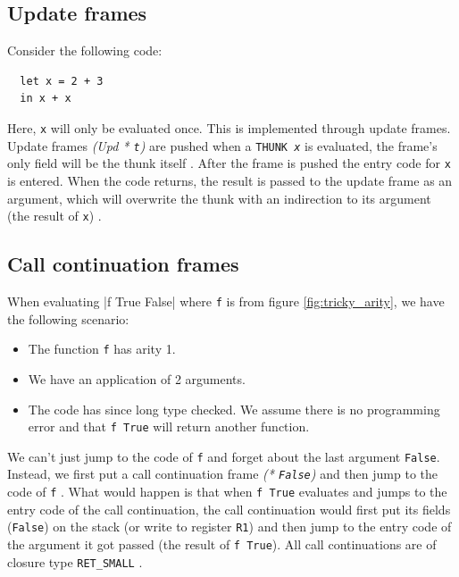 \subsection{Update frames}

Consider the following code:

\begin{verbatim}
  let x = 2 + 3
  in x + x
\end{verbatim}

Here, \texttt{x} will only be evaluated once. This is implemented
through update frames. Update frames \emph{(Upd * \texttt{t})}
are pushed when a \texttt{THUNK \emph{x}} is evaluated, the frame's only
field will be the thunk itself \cite{github_thunk_code}. After the frame is
pushed the entry code for \texttt{x} is entered. When the code returns,
the result is passed to the update frame as an argument, which will
overwrite the thunk with an indirection to its argument (the result of
\texttt{x}) \cite{github_updates_indirection}.


\subsection{Call continuation frames} \label{sec:call_continuation_frames}

When evaluating |f True False|
where \texttt{f} is from figure \ref{fig:tricky_arity}, we have the
following scenario:

\begin{itemize}
  \item
    The function \texttt{f} has arity 1.
  \item
    We have an application of 2 arguments.
  \item
    The code has since long type checked. We assume there is no
programming error and that \texttt{f True} will return another function.
\end{itemize}

We can't just jump to the code of \texttt{f} and forget about the last
argument \texttt{False}. Instead, we first put a call continuation
frame \emph{(* \texttt{False})} and then jump to the code of \texttt{f}
\cite{evalapplyjfp06}. %
What would happen is that when \texttt{f True} evaluates and jumps to
the entry code of the call continuation, the call continuation would
first put its fields (\texttt{False}) on the stack (or write to
register \texttt{R1}) and then jump to the entry code of the argument it
got passed (the result of \texttt{f True}).
All call continuations are of closure type \texttt{RET\_SMALL}
\cite{github_genapply_RET_SMALL}.

